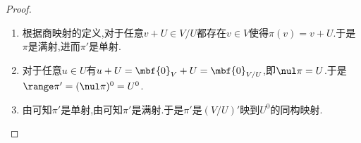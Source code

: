 \documentclass{ctexart}
\begin{document}
\begin{proof}
    \begin{enumerate}[label=\tbf{(\arabic*)}]
        \item 根据商映射的定义,对于任意$v+U\in V/U$都存在$v\in V$使得$\pi(v)=v+U$.于是$\pi$是满射,进而$\pi'$是单射.
        \item 对于任意$u\in U$有$u+U=\mbf{0}_{V}+U=\mbf{0}_{V/U}$,即$\nul\pi=U$.于是$\range \pi'=(\nul\pi)^0=U^0$.
        \item 由可知$\pi'$是单射,由可知$\pi'$是满射.于是$\pi'$是$(V/U)'$映到$U^0$的同构映射.
    \end{enumerate}
\end{proof}
\end{document}
